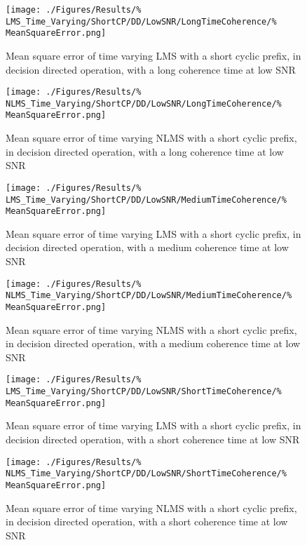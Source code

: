 \begin{figure}[ht]
	\centering
	\begin{minipage}{0.49\textwidth}
		\centering
		\texttt{[image: ./Figures/Results/\%
	LMS\_Time\_Varying/ShortCP/DD/LowSNR/LongTimeCoherence/\%
	MeanSquareError.png]}
		\caption{Mean square error of time varying LMS with a 
		short cyclic prefix, in decision directed operation, 
		with a long coherence time at low SNR}
	\end{minipage}
	\begin{minipage}{0.49\textwidth}
		\centering
		\texttt{[image: ./Figures/Results/\%
	NLMS\_Time\_Varying/ShortCP/DD/LowSNR/LongTimeCoherence/\%
	MeanSquareError.png]}
		\caption{Mean square error of time varying NLMS with 
		a short cyclic prefix, in decision directed 
		operation, with a long coherence time at low SNR}
	\end{minipage}
\end{figure}

\begin{figure}[ht]
	\centering
	\begin{minipage}{0.49\textwidth}
		\centering
		\texttt{[image: ./Figures/Results/\%
	LMS\_Time\_Varying/ShortCP/DD/LowSNR/MediumTimeCoherence/\%
	MeanSquareError.png]}
		\caption{Mean square error of time varying LMS with a 
		short cyclic prefix, in decision directed operation, 
		with a medium coherence time at low SNR}
	\end{minipage}
	\begin{minipage}{0.49\textwidth}
		\centering
		\texttt{[image: ./Figures/Results/\%
	NLMS\_Time\_Varying/ShortCP/DD/LowSNR/MediumTimeCoherence/\%
	MeanSquareError.png]}
		\caption{Mean square error of time varying NLMS with 
		a short cyclic prefix, in decision directed 
		operation, with a medium coherence time at low SNR}
	\end{minipage}
\end{figure}

\begin{figure}[ht]
	\centering
	\begin{minipage}{0.49\textwidth}
		\centering
		\texttt{[image: ./Figures/Results/\%
	LMS\_Time\_Varying/ShortCP/DD/LowSNR/ShortTimeCoherence/\%
	MeanSquareError.png]}
		\caption{Mean square error of time varying LMS with a 
		short cyclic prefix, in decision directed operation, 
		with a short coherence time at low SNR}
	\end{minipage}
	\begin{minipage}{0.49\textwidth}
		\centering
		\texttt{[image: ./Figures/Results/\%
	NLMS\_Time\_Varying/ShortCP/DD/LowSNR/ShortTimeCoherence/\%
	MeanSquareError.png]}
		\caption{Mean square error of time varying NLMS with 
		a short cyclic prefix, in decision directed 
		operation, with a short coherence time at low SNR}
	\end{minipage}
\end{figure}

